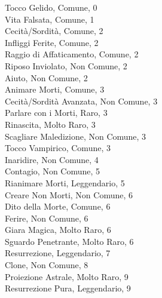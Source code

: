 \begin{multicols}{3}
Tocco Gelido, Comune, 0\\
Vita Falsata, Comune, 1\\
Cecità/Sordità, Comune, 2\\
Infliggi Ferite, Comune, 2\\
Raggio di Affaticamento, Comune, 2\\
Riposo Inviolato, Non Comune, 2\\
Aiuto, Non Comune, 2\\
Animare Morti, Comune, 3\\
Cecità/Sordità Avanzata, Non Comune, 3\\
Parlare con i Morti, Raro, 3\\
Rinascita, Molto Raro, 3\\
Scagliare Maledizione, Non Comune, 3\\
Tocco Vampirico, Comune, 3\\
Inaridire, Non Comune, 4\\
Contagio, Non Comune, 5\\
Rianimare Morti, Leggendario, 5\\
Creare Non Morti, Non Comune, 6\\
Dito della Morte, Comune, 6\\
Ferire, Non Comune, 6\\
Giara Magica, Molto Raro, 6\\
Sguardo Penetrante, Molto Raro, 6\\
Resurrezione, Leggendario, 7\\
Clone, Non Comune, 8\\
Proiezione Astrale, Molto Raro, 9\\
Resurrezione Pura, Leggendario, 9\\



\end{multicols}
